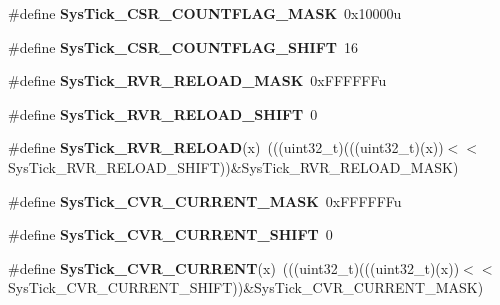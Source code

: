 \begin{DoxyCompactItemize}
\#define {\bfseries Sys\+Tick\+\_\+\+C\+S\+R\+\_\+\+C\+O\+U\+N\+T\+F\+L\+A\+G\+\_\+\+M\+A\+SK}~0x10000u
\item 
\mbox{\label{group___sys_tick___register___masks_ga9764e4e8c4ee1b8383ec52f061bd1c87}} 
\#define {\bfseries Sys\+Tick\+\_\+\+C\+S\+R\+\_\+\+C\+O\+U\+N\+T\+F\+L\+A\+G\+\_\+\+S\+H\+I\+FT}~16
\item 
\mbox{\label{group___sys_tick___register___masks_gaec96452b3f6bd6a6ca6496cbbad9a9aa}} 
\#define {\bfseries Sys\+Tick\+\_\+\+R\+V\+R\+\_\+\+R\+E\+L\+O\+A\+D\+\_\+\+M\+A\+SK}~0x\+F\+F\+F\+F\+F\+Fu
\item 
\mbox{\label{group___sys_tick___register___masks_gaada5987ab8604965af6e1437c97ee963}} 
\#define {\bfseries Sys\+Tick\+\_\+\+R\+V\+R\+\_\+\+R\+E\+L\+O\+A\+D\+\_\+\+S\+H\+I\+FT}~0
\item 
\mbox{\label{group___sys_tick___register___masks_gaab84497fc1ee448346a37dec6c8971d0}} 
\#define {\bfseries Sys\+Tick\+\_\+\+R\+V\+R\+\_\+\+R\+E\+L\+O\+AD}(x)~(((uint32\+\_\+t)(((uint32\+\_\+t)(x))$<$$<$Sys\+Tick\+\_\+\+R\+V\+R\+\_\+\+R\+E\+L\+O\+A\+D\+\_\+\+S\+H\+I\+FT))\&Sys\+Tick\+\_\+\+R\+V\+R\+\_\+\+R\+E\+L\+O\+A\+D\+\_\+\+M\+A\+SK)
\item 
\mbox{\label{group___sys_tick___register___masks_ga24c6d345c97c669b426339ffda71aa8b}} 
\#define {\bfseries Sys\+Tick\+\_\+\+C\+V\+R\+\_\+\+C\+U\+R\+R\+E\+N\+T\+\_\+\+M\+A\+SK}~0x\+F\+F\+F\+F\+F\+Fu
\item 
\mbox{\label{group___sys_tick___register___masks_ga1e9eb575c58a4638dabd21775fa22c19}} 
\#define {\bfseries Sys\+Tick\+\_\+\+C\+V\+R\+\_\+\+C\+U\+R\+R\+E\+N\+T\+\_\+\+S\+H\+I\+FT}~0
\item 
\mbox{\label{group___sys_tick___register___masks_ga497e7408313e5f2d8dfff60fc2a8dd0e}} 
\#define {\bfseries Sys\+Tick\+\_\+\+C\+V\+R\+\_\+\+C\+U\+R\+R\+E\+NT}(x)~(((uint32\+\_\+t)(((uint32\+\_\+t)(x))$<$$<$Sys\+Tick\+\_\+\+C\+V\+R\+\_\+\+C\+U\+R\+R\+E\+N\+T\+\_\+\+S\+H\+I\+FT))\&Sys\+Tick\+\_\+\+C\+V\+R\+\_\+\+C\+U\+R\+R\+E\+N\+T\+\_\+\+M\+A\+SK)

\end{DoxyCompactItemize}
